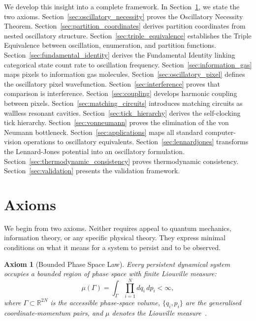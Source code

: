 \documentclass[11pt,twocolumn,a4paper]{article}
\newtheorem{axiom}{Axiom}
\newcommand{\R}{\mathbb{R}}
\begin{document}
We develop this insight into a complete framework. In Section~\ref{sec:axioms}, we state the two axioms. Section~\ref{sec:oscillatory_necessity} proves the Oscillatory Necessity Theorem. Section~\ref{sec:partition_coordinates} derives partition coordinates from nested oscillatory structure. Section~\ref{sec:triple_equivalence} establishes the Triple Equivalence between oscillation, enumeration, and partition functions. Section~\ref{sec:fundamental_identity} derives the Fundamental Identity linking categorical state count rate to oscillation frequency. Section~\ref{sec:information_gas} maps pixels to information gas molecules. Section~\ref{sec:oscillatory_pixel} defines the oscillatory pixel wavefunction. Section~\ref{sec:interference} proves that comparison is interference. Section~\ref{sec:coupling} develops harmonic coupling between pixels. Section~\ref{sec:matching_circuits} introduces matching circuits as wallless resonant cavities. Section~\ref{sec:tick_hierarchy} derives the self-clocking tick hierarchy. Section~\ref{sec:vonneumann} proves the elimination of the von Neumann bottleneck. Section~\ref{sec:applications} maps all standard computer-vision operations to oscillatory equivalents. Section~\ref{sec:lennardjones} transforms the Lennard-Jones potential into an oscillatory formulation. Section~\ref{sec:thermodynamic_consistency} proves thermodynamic consistency. Section~\ref{sec:validation} presents the validation framework.

\section{Axioms}\label{sec:axioms}

We begin from two axioms. Neither requires appeal to quantum mechanics, information theory, or any specific physical theory. They express minimal conditions on what it means for a system to persist and to be observed.

\begin{axiom}[Bounded Phase Space Law]\label{ax:bounded}
Every persistent dynamical system occupies a bounded region of phase space with finite Liouville measure:
\begin{equation}
\mu(\Gamma) = \int_\Gamma \prod_{i=1}^{N} dq_i \, dp_i < \infty,
\label{eq:liouville_measure}
\end{equation}
where $\Gamma \subset \R^{2N}$ is the accessible phase-space volume, $\{q_i, p_i\}$ are the generalised coordinate-momentum pairs, and $\mu$ denotes the Liouville measure~\citep{liouville1838, arnold1989}.
\end{axiom}
\end{document}
